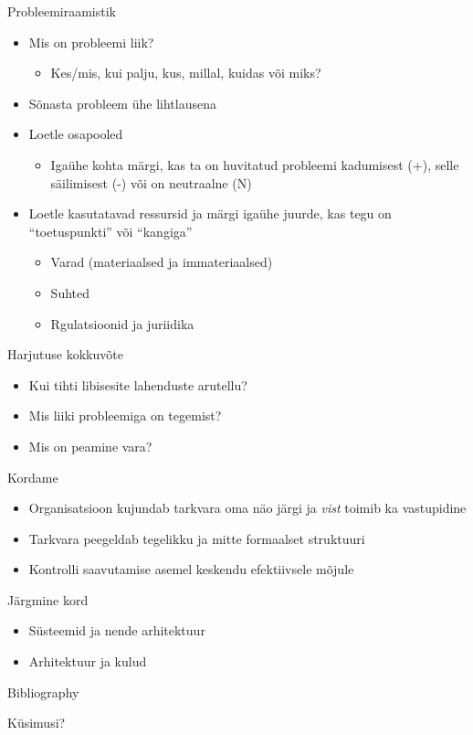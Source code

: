 \documentclass{beamer}
\begin{document}
\begin{frame}{Probleemiraamistik}
	\begin{itemize}
		\item Mis on probleemi liik?
		\begin{itemize}
			\item Kes/mis, kui palju, kus, millal, kuidas või miks?
		\end{itemize}
		\item Sõnasta probleem ühe lihtlausena
		\item Loetle osapooled
		\begin{itemize}
			\item Igaühe kohta märgi, kas ta on huvitatud probleemi kadumisest (+), selle säilimisest (-) või on neutraalne (N)
		\end{itemize}
		\item Loetle kasutatavad ressursid ja märgi igaühe juurde, kas tegu on \enquote{toetuspunkti} või \enquote{kangiga}
		\begin{itemize}
			\item Varad (materiaalsed ja immateriaalsed)
			\item Suhted
			\item Rgulatsioonid ja juriidika
		\end{itemize}
	\end{itemize}
\end{frame}


\begin{frame}{Harjutuse kokkuvõte}
	\begin{itemize}
		\item Kui tihti libisesite lahenduste arutellu?
		\item Mis liiki probleemiga on tegemist?
		\item Mis on peamine vara?
	\end{itemize}
\end{frame}


\begin{frame}{Kordame}
	\begin{itemize}
		\item Organisatsioon kujundab tarkvara oma näo järgi ja \emph{vist} toimib ka vastupidine
		\item Tarkvara peegeldab tegelikku ja mitte formaalset struktuuri
		\item Kontrolli saavutamise asemel keskendu efektiivsele mõjule
	\end{itemize}
\end{frame}

\begin{frame}{Järgmine kord}
\begin{itemize}
	\item Süsteemid ja nende arhitektuur
	\item Arhitektuur ja kulud
	\end{itemize}
\end{frame}

\begin{frame}{Bibliography}
	
	
\end{frame}

\begin{frame}[standout]
Küsimusi?
\end{frame}
\end{document}
